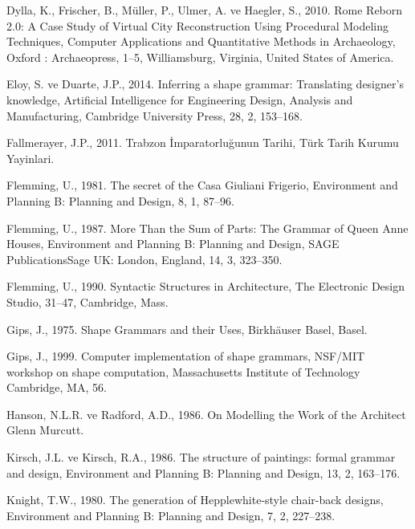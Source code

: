 \documentclass[12pt,turkish,a4paperpaper,]{report}
\begin{document}
\leavevmode\hypertarget{ref-Dylla:2010tm}{}%
Dylla, K., Frischer, B., Müller, P., Ulmer, A. ve Haegler, S., 2010.
Rome Reborn 2.0: A Case Study of Virtual City Reconstruction Using
Procedural Modeling Techniques, Computer Applications and Quantitative
Methods in Archaeology, Oxford : Archaeopress, 1--5, Williamsburg,
Virginia, United States of America.

\leavevmode\hypertarget{ref-Eloy:2014kn}{}%
Eloy, S. ve Duarte, J.P., 2014. Inferring a shape grammar: Translating
designer's knowledge, Artificial Intelligence for Engineering Design,
Analysis and Manufacturing, Cambridge University Press, 28, 2, 153--168.

\leavevmode\hypertarget{ref-Fallmerayer:2011vq}{}%
Fallmerayer, J.P., 2011. Trabzon İmparatorluğunun Tarihi, Türk Tarih
Kurumu Yayinlari.

\leavevmode\hypertarget{ref-Flemming:1981hm}{}%
Flemming, U., 1981. The secret of the Casa Giuliani Frigerio,
Environment and Planning B: Planning and Design, 8, 1, 87--96.

\leavevmode\hypertarget{ref-Flemming:1987js}{}%
Flemming, U., 1987. More Than the Sum of Parts: The Grammar of Queen
Anne Houses, Environment and Planning B: Planning and Design, SAGE
PublicationsSage UK: London, England, 14, 3, 323--350.

\leavevmode\hypertarget{ref-Flemming:1990tn}{}%
Flemming, U., 1990. Syntactic Structures in Architecture, The Electronic
Design Studio, 31--47, Cambridge, Mass.

\leavevmode\hypertarget{ref-Gips:1975jg}{}%
Gips, J., 1975. Shape Grammars and their Uses, Birkhäuser Basel, Basel.

\leavevmode\hypertarget{ref-Gips:1999ut}{}%
Gips, J., 1999. Computer implementation of shape grammars, NSF/MIT
workshop on shape computation, Massachusetts Institute of Technology
Cambridge, MA, 56.

\leavevmode\hypertarget{ref-Hanson:1986ty}{}%
Hanson, N.L.R. ve Radford, A.D., 1986. On Modelling the Work of the
Architect Glenn Murcutt.

\leavevmode\hypertarget{ref-Kirsch:1986bi}{}%
Kirsch, J.L. ve Kirsch, R.A., 1986. The structure of paintings: formal
grammar and design, Environment and Planning B: Planning and Design, 13,
2, 163--176.

\leavevmode\hypertarget{ref-Knight:1980cl}{}%
Knight, T.W., 1980. The generation of Hepplewhite-style chair-back
designs, Environment and Planning B: Planning and Design, 7, 2,
227--238.
\end{document}
